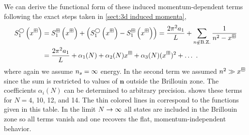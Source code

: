 We can derive the functional form of these induced momentum-dependent terms following the exact steps taken in \autoref{sect:3d induced momenta},
\begin{align*}
S^\bigcirc_{1}\left(x^\dispersion\right)&=S^{\dispersion}_{1}\left(x^\dispersion\right)+\left(S^\bigcirc_{1}\left(x^\dispersion\right)  -S^{\dispersion}_{1}\left(x^\dispersion\right)\right) %
=\frac{2\pi^2 a_{1}}{L}+ \sum_{n\notin \operatorname{B.Z.}} \frac{1}{n^{2}-x^\dispersion} \\
&=\frac{2\pi^2 a_{1}}{L}+\alpha_1(N)+ \alpha_2(N)x^\dispersion+\alpha_3(N)(x^\dispersion)^2+\ldots\ .
\end{align*}
where again we assume ${n_s}=\infty$ energy.
In the second term we assumed $n^2\gg x^\boxplus$ since the sum is restricted to values of $\bm{n}$ outside the Brillouin zone.
The coefficients $\alpha_i(N)$ can be determined to arbitrary precision.
 shows these terms for $N=4$, 10, 12, and 14.
The thin colored lines in  correspond to the functions given in this table.
In the limit $N\rightarrow\infty$ all states are included in the Brillouin zone so all terms vanish and one recovers the flat, momentum-independent behavior.

